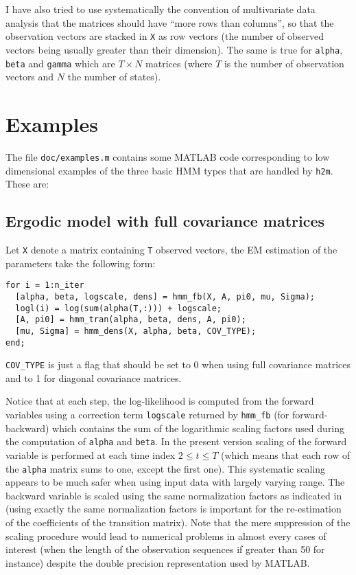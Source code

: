 \documentclass[a4paper,11pt]{article}
\newcommand{\hmm}{{\tt h2m}}
\begin{document}
I have also tried to use systematically the convention of multivariate data analysis that the matrices should have ``more rows than columns'', so that the observation vectors are stacked in \verb+X+ as row vectors (the number of observed vectors being usually greater than their dimension). The same is true for \verb+alpha+, \verb+beta+ and \verb+gamma+ which are $T \times N$ matrices (where $T$ is the number of observation vectors and $N$ the number of states).

\section{Examples}
The file \verb+doc/examples.m+ contains some MATLAB code corresponding to low dimensional examples of the three basic HMM types that are handled by \hmm. These are:

\subsection{Ergodic model with full covariance matrices}
Let \verb+X+ denote a matrix containing \verb+T+ observed vectors, the EM estimation of the parameters take the following form:
\begin{verbatim}
for i = 1:n_iter
  [alpha, beta, logscale, dens] = hmm_fb(X, A, pi0, mu, Sigma);
  logl(i) = log(sum(alpha(T,:))) + logscale;
  [A, pi0] = hmm_tran(alpha, beta, dens, A, pi0);
  [mu, Sigma] = hmm_dens(X, alpha, beta, COV_TYPE);
end;
\end{verbatim}
\verb+COV_TYPE+ is just a flag that should be set to 0 when using full covariance matrices and to 1 for diagonal covariance matrices.

Notice that at each step, the log-likelihood is computed from the forward variables using a correction term \verb+logscale+ returned by \verb+hmm_fb+ (for forward-backward) which contains the sum of the logarithmic scaling factors used during the computation of \verb+alpha+ and \verb+beta+. In the present version scaling of the forward variable is performed at each time index $2 \le t \le T$ (which means that each row of the \verb+alpha+ matrix sums to one, except the first one). This systematic scaling appears to be much safer when using input data with largely varying range. The backward variable is scaled using the same normalization factors as indicated in \cite{Rabiner:HMM} (using exactly the same normalization factors is important for the re-estimation of the coefficients of the transition matrix). Note that the mere suppression of the scaling procedure would lead to numerical problems in almost every cases of interest (when the length of the observation sequences if greater than 50 for instance) despite the double precision representation used by MATLAB.
\end{document}
